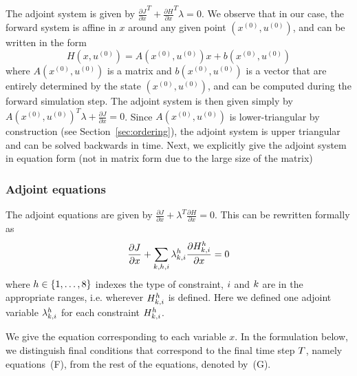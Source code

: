 
The adjoint system is given by $\frac{\partial J}{\partial x}^T + \frac{\partial H}{\partial x}^T\lambda = 0$. We observe that in our case, the forward system is affine in $x$ around any given point $(x^{(0)}, u^{(0)})$, and can be written in the form
\begin{equation}
H(x, u^{(0)}) = A(x^{(0)}, u^{(0)}) x + b(x^{(0)}, u^{(0)})
\end{equation}
where $A(x^{(0)}, u^{(0)})$ is a matrix and $b(x^{(0)}, u^{(0)})$ is a vector that are entirely determined by the state $(x^{(0)}, u^{(0)})$, and can be computed during the forward simulation step. The adjoint system is then given simply by
$A(x^{(0)}, u^{(0)})^T \lambda + \frac{\partial J}{\partial x} = 0$. Since $A(x^{(0)}, u^{(0)})$ is lower-triangular by construction (see Section~\ref{sec:ordering}), the adjoint system is upper triangular and can be solved backwards in time. Next, we explicitly give the adjoint system in equation form (not in matrix form due to the large size of the matrix)

\subsubsection{Adjoint equations}

\setcounter{oldequation}{\theequation}
\setcounter{equation}{0}
\renewcommand{\theequation}{G\arabic{equation}}


The adjoint equations are given by $\frac{\partial J}{\partial x} + \lambda^T\frac{\partial H}{\partial x} = 0$. This can be rewritten formally as
\[
\frac{\partial J}{\partial x} + \sum_{k, h, i} \lambda^{h}_{k, i} \frac{\partial H^{h}_{k, i}}{\partial x} = 0
\]
where $h \in \{1, \dots, 8\}$ indexes the type of constraint, $i$ and $k$ are in the appropriate ranges, i.e. wherever $H^{h}_{k, i}$ is defined. Here we defined one adjoint variable $\lambda^{h}_{k, i}$ for each constraint $H^{h}_{k, i}$.

We give the equation corresponding to each variable $x$. In the formulation below, we distinguish final conditions that correspond to the final time step $T$, namely equations~(F), from the rest of the equations, denoted by~(G).

